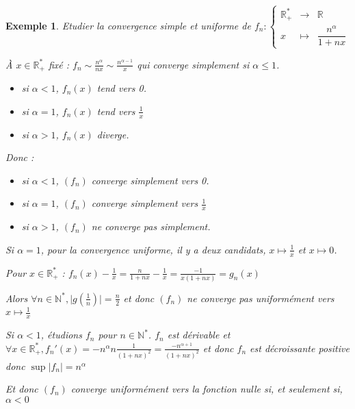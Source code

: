 \documentclass[a4paper,12pt]{book}
\newtheorem{Exe}{Exemple}[section]
\def\R{\mathbb{R}}
\def\N{\mathbb{N}}
\begin{document}
\begin{Exe}
Etudier la convergence simple et uniforme de $f_n:\left\{\begin{array}{rcl} \R_+^* & \to & \R \\ x & \mapsto & \dfrac{n^\alpha}{1+nx} \end{array}\right.$ \par À $x\in\R_+^*$ fixé : $f_n\sim \frac{n^\alpha}{nx}\sim\frac{n^{\alpha-1}}{x}$ qui converge simplement si $\alpha\leq 1$.\begin{itemize} \item si $\alpha<1$, $f_n(x)$ tend vers 0. \item si $\alpha=1$, $f_n(x)$ tend vers $\frac{1}{x}$ \item si $\alpha>1$, $f_n(x)$ diverge.\end{itemize} \par Donc :\begin{itemize} \item si $\alpha<1$, $(f_n)$ converge simplement vers 0. \item si $\alpha=1$, $(f_n)$ converge simplement vers $\frac{1}{x}$ \item si $\alpha>1$, $(f_n)$ ne converge pas simplement.\end{itemize} 
\par Si $\alpha=1$, pour la convergence uniforme, il y a deux candidats, $x\mapsto\frac{1}{x}$ et $x\mapsto 0$. \par Pour $x\in\R_+^*$ : $f_n(x)-\frac{1}{x}=\frac{n}{1+nx}-\frac{1}{x}=\frac{-1}{x(1+nx)}=g_n(x)$ \par Alors $\forall n\in\N^*,\vert g(\frac{1}{n})\vert=\frac{n}{2}$ et donc $(f_n)$ ne converge pas uniformément vers $x\mapsto\frac{1}{x}$
\par Si $\alpha<1$, étudions $f_n$ pour $n\in\N^*$. $f_n$ est dérivable et $\forall x\in\R_+^*, f_n'(x) = -n^\alpha n\frac{1}{(1+nx)^2} = \frac{-n^{\alpha+1}}{(1+nx)^2}$ et donc $f_n$ est décroissante positive donc $\sup\vert f_n\vert=n^\alpha$ \par Et donc $(f_n)$ converge uniformément vers la fonction nulle si, et seulement si, $\alpha<0$
\end{Exe}
\end{document}
